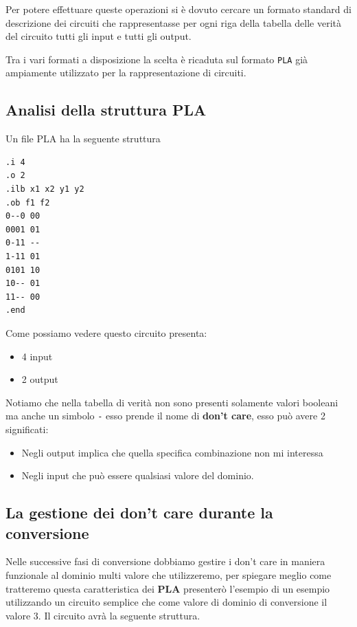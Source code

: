 \documentclass[
  italian,
]{book}
\providecommand{\tightlist}{%
  \setlength{\itemsep}{0pt}\setlength{\parskip}{0pt}}
\begin{document}
Per potere effettuare queste operazioni si è dovuto cercare un formato standard di descrizione dei circuiti che rappresentasse per ogni riga della tabella delle verità del circuito tutti gli input e tutti gli output.

Tra i vari formati a disposizione la scelta è ricaduta sul formato \texttt{PLA} già ampiamente utilizzato per la rappresentazione di circuiti.

\newpage

\hypertarget{analisi-della-struttura-pla}{%
\subsection{Analisi della struttura PLA}\label{analisi-della-struttura-pla}}

Un file PLA ha la seguente struttura

\begin{verbatim}
.i 4
.o 2
.ilb x1 x2 y1 y2
.ob f1 f2
0--0 00    
0001 01
0-11 --
1-11 01
0101 10
10-- 01
11-- 00
.end
\end{verbatim}

Come possiamo vedere questo circuito presenta:

\begin{itemize}
\tightlist
\item
  4 input
\item
  2 output
\end{itemize}

Notiamo che nella tabella di verità non sono presenti solamente valori booleani ma anche un simbolo \texttt{-} esso prende il nome di \textbf{don't care}, esso può avere 2 significati:

\begin{itemize}
\tightlist
\item
  Negli output implica che quella specifica combinazione non mi interessa
\item
  Negli input che può essere qualsiasi valore del dominio.
\end{itemize}

\newpage

\hypertarget{la-gestione-dei-dont-care-durante-la-conversione}{%
\subsection{La gestione dei don't care durante la conversione}\label{la-gestione-dei-dont-care-durante-la-conversione}}

Nelle successive fasi di conversione dobbiamo gestire i don't care in maniera funzionale al dominio multi valore che utilizzeremo, per spiegare meglio come tratteremo questa caratteristica dei \textbf{PLA} presenterò l'esempio di un esempio utilizzando un circuito semplice che come valore di dominio di conversione il valore 3. Il circuito avrà la seguente struttura.
\end{document}

